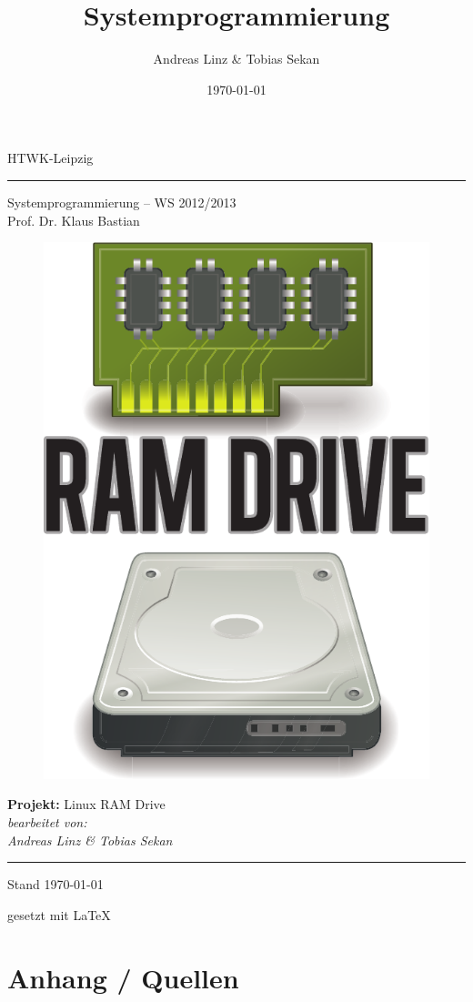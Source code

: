 

\title{Systemprogrammierung}
\author{Andreas Linz & Tobias Sekan}
\date{\today}


    \begin{titlepage}
        \begin{center}
        {\LARGE HTWK-Leipzig}\\[\baselineskip]
        \hrule \vspace{12pt}
        {\Large Systemprogrammierung -- WS 2012/2013}\\
        {\normalsize Prof. Dr. Klaus Bastian}\\[2\baselineskip]
        
        \begin{figure}[!h]
        	\centering
	        \includegraphics[width=0.4\linewidth]{../images/title_logo}\\        
        \end{figure}
      	
		{\LARGE \textbf{Projekt:} Linux RAM Drive}\\[2\baselineskip]
        \textit{bearbeitet von:\\Andreas Linz \& Tobias Sekan}\\[\baselineskip]
        \hrule
		\vfill
        Stand \today
        \vfill
        \begin{flushright}
         gesetzt mit \LaTeX
        \end{flushright}
        \end{center}
    \end{titlepage}

    \tableofcontents

    \newpage

	\setcounter{page}{1}
	
	
	\underline{}
	\newpage
	
	\appendix
	\section{Anhang / Quellen}
	
	


